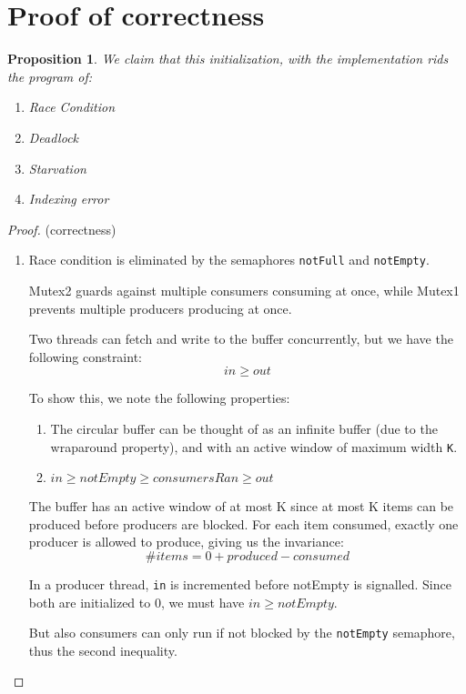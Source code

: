 \documentclass[12pt, a4paper]{article}
\newtheorem{prop}{Proposition}[section]
\begin{document}
\section{Proof of correctness}
\begin{prop}
  We claim that this initialization, with the implementation rids the program
  of:
  \begin{enumerate}
    \item Race Condition
    \item Deadlock
    \item Starvation
    \item Indexing error
  \end{enumerate}
\end{prop}
\begin{proof} (correctness)
  \begin{enumerate}
    \item {
        Race condition is eliminated by the semaphores \verb|notFull| and
        \verb|notEmpty|.

        Mutex2 guards against multiple consumers consuming at once, while
        Mutex1 prevents multiple producers producing at once.

        Two threads can fetch and write to the buffer concurrently, but we
        have the following constraint:
        \[ in \geq out \]

        To show this, we note the following properties:
        \begin{enumerate}
          \item The circular buffer can be thought of as an infinite buffer
            (due to the wraparound property), and with an active window of
            maximum width \verb|K|.
          \item $in \geq notEmpty \geq consumersRan \geq out$
        \end{enumerate}

        The buffer has an active window of at most K since at most K items
        can be produced before producers are blocked. For each item consumed,
        exactly one producer is allowed to produce, giving us the invariance:
        \[ \#items = 0 + produced - consumed \]

        In a producer thread, \verb|in| is incremented before notEmpty is
        signalled. Since both are initialized to 0, we must have
        $in \geq notEmpty$.

        But also consumers can only run if not blocked by the \verb|notEmpty|
        semaphore, thus the second inequality.

}
\end{enumerate}
\end{proof}
\end{document}
